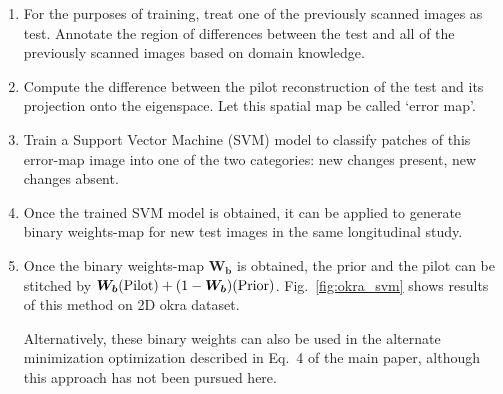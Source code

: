 \documentclass{article}
\begin{document}
\begin{enumerate}
\item For the purposes of training, treat one of the previously scanned images as test. Annotate the region of differences between the test and all of the previously scanned images based on domain knowledge.
\item Compute the difference between the pilot reconstruction of the test and its projection onto the eigenspace. Let this spatial map be called `error map'.
\item Train a Support Vector Machine (SVM) model to classify patches of this error-map image into one of the two categories: new changes present, new changes absent.
\item Once the trained SVM model is obtained, it can be applied to generate binary weights-map for new test images in the same longitudinal study.
\item Once the binary weights-map $\boldsymbol{W_b}$ is obtained, the prior and the pilot can be stitched by $\boldsymbol{W_b}(\rm{Pilot}) + (1-\boldsymbol{W_b})(\rm{Prior})$. Fig.~\ref{fig:okra_svm} shows results of this method on 2D okra dataset.

  Alternatively, these binary weights can also be used in the alternate minimization optimization described in Eq.~4 of the main paper, although this approach has not been pursued here. 

\end{enumerate} 
\end{document}
